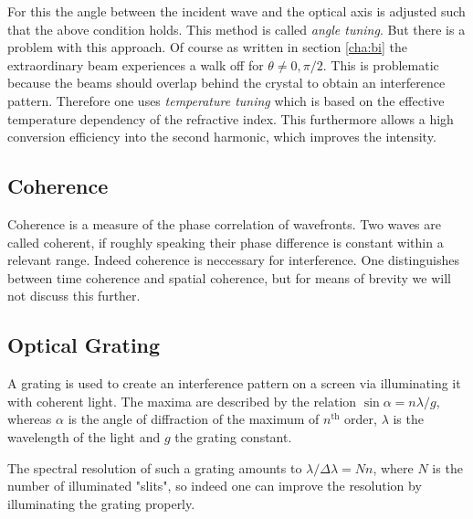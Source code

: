 \documentclass{protokoll_en}
\begin{document}
For this the angle between the incident wave and the optical axis is adjusted such that the above condition holds. This method is called \emph{angle tuning}. But there is a problem with this approach. Of course as written in section \ref{cha:bi} the extraordinary beam experiences a walk off for $\theta \neq 0, \pi/2$. This is problematic because the beams should overlap behind the crystal to obtain an interference pattern. Therefore one uses \emph{temperature tuning} which is based on the effective temperature dependency of the refractive index. This furthermore allows a high conversion efficiency into the second harmonic, which improves the intensity.

\subsection{Coherence}
Coherence is a measure of the phase correlation of wavefronts. Two waves are called coherent, if roughly speaking their phase difference is constant within a relevant range. Indeed coherence is neccessary for interference. One distinguishes between time coherence and spatial coherence, but for means of brevity we will not discuss this further.

\subsection{Optical Grating}
A grating is used to create an interference pattern on a screen via illuminating it with coherent light. The maxima are described by the relation $\sin{\alpha} = n \lambda/g$, whereas $\alpha$ is the angle of diffraction of the maximum of $n^{\mathrm{th}}$ order, $\lambda$ is the wavelength of the light and $g$ the grating constant.

The spectral resolution of such a grating amounts to $\lambda/\Delta\lambda = N n$, where $N$ is the number of illuminated "slits", so indeed one can improve the resolution by illuminating the grating properly.
\end{document}
